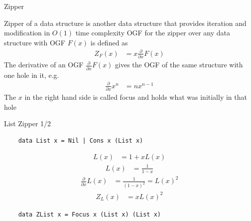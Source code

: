\documentclass[pdf]{beamer}
\begin{document}
\begin{frame}{Zipper}
  \begin{outline}
    \1 Zipper of a data structure is another data structure that provides iteration and modification in $O(1)$ time complexity
    \1 OGF for the zipper over any data structure with OGF $F(x)$ is defined as
    \begin{align*}
      Z_F(x) &= x \frac{\partial}{\partial{x}}F(x)
    \end{align*}
    \1 The derivative of an OGF $\frac{\partial}{\partial{x}}F(x)$ gives the OGF of the same structure with one hole in it, e.g.
    \begin{align*}
      \frac{\partial}{\partial{x}}x^n &= n x^{n-1}
    \end{align*}
    \1 The $x$ in the right hand side is called focus and holds what was initially in that hole
  \end{outline}
\end{frame}

\begin{frame}[fragile]{List Zipper 1/2}
  \begin{verbatim}
    data List x = Nil | Cons x (List x)
  \end{verbatim}
  \begin{align*}
    L(x) &= 1 + xL(x)
  \end{align*}
  \begin{align*}
    L(x) &= \frac{1}{1-x}
  \end{align*}
  \begin{align*}
    \frac{\partial}{\partial{x}}L(x) &= \frac{1}{(1-x)^2} = L(x)^2
  \end{align*}
  \begin{align*}
    Z_L(x) &= x L(x)^2
  \end{align*}
  \begin{verbatim}
    data ZList x = Focus x (List x) (List x)
  \end{verbatim}
\end{frame}
\end{document}
